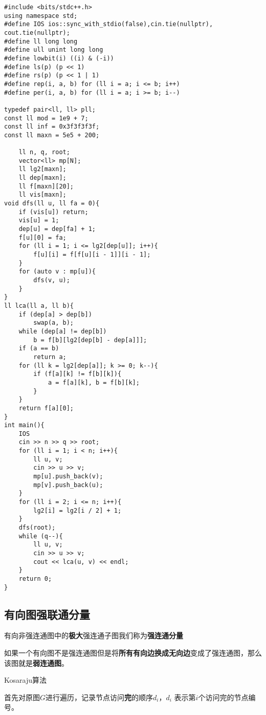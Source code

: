 \documentclass[]{article}
\begin{document}
\begin{verbatim}
#include <bits/stdc++.h>
using namespace std;
#define IOS ios::sync_with_stdio(false),cin.tie(nullptr), cout.tie(nullptr);
#define ll long long
#define ull unint long long
#define lowbit(i) ((i) & (-i))
#define ls(p) (p << 1)
#define rs(p) (p << 1 | 1)
#define rep(i, a, b) for (ll i = a; i <= b; i++)
#define per(i, a, b) for (ll i = a; i >= b; i--)

typedef pair<ll, ll> pll;
const ll mod = 1e9 + 7;
const ll inf = 0x3f3f3f3f;
const ll maxn = 5e5 + 200;

    ll n, q, root; 
    vector<ll> mp[N];
    ll lg2[maxn];
    ll dep[maxn];
    ll f[maxn][20];
    ll vis[maxn];
void dfs(ll u, ll fa = 0){
    if (vis[u]) return;
    vis[u] = 1;
    dep[u] = dep[fa] + 1;
    f[u][0] = fa;
    for (ll i = 1; i <= lg2[dep[u]]; i++){
        f[u][i] = f[f[u][i - 1]][i - 1];
    }
    for (auto v : mp[u]){
        dfs(v, u);
    }
}
ll lca(ll a, ll b){
    if (dep[a] > dep[b])
        swap(a, b);
    while (dep[a] != dep[b])
        b = f[b][lg2[dep[b] - dep[a]]];
    if (a == b)
        return a;
    for (ll k = lg2[dep[a]]; k >= 0; k--){
        if (f[a][k] != f[b][k]){
            a = f[a][k], b = f[b][k];
        }
    }
    return f[a][0];
}
int main(){
    IOS 
    cin >> n >> q >> root;
    for (ll i = 1; i < n; i++){
        ll u, v;
        cin >> u >> v;
        mp[u].push_back(v);
        mp[v].push_back(u);
    }
    for (ll i = 2; i <= n; i++){
        lg2[i] = lg2[i / 2] + 1;
    }
    dfs(root);
    while (q--){
        ll u, v;
        cin >> u >> v;
        cout << lca(u, v) << endl;
    }
    return 0;
}
\end{verbatim}

\hypertarget{ux6709ux5411ux56feux5f3aux8054ux901aux5206ux91cf}{%
\subsection{有向图强联通分量}\label{ux6709ux5411ux56feux5f3aux8054ux901aux5206ux91cf}}

有向非强连通图中的\textbf{极大}强连通子图我们称为\textbf{强连通分量}

如果一个有向图不是强连通图但是将\textbf{所有有向边换成无向边}变成了强连通图，那么该图就是\textbf{弱连通图}。

Kosaraju算法

首先对原图\(G\)进行遍历，记录节点访问\textbf{完}的顺序\(d_i\)，\(d_i\)
表示第\(i\)个访问完的节点编号。
\end{document}
